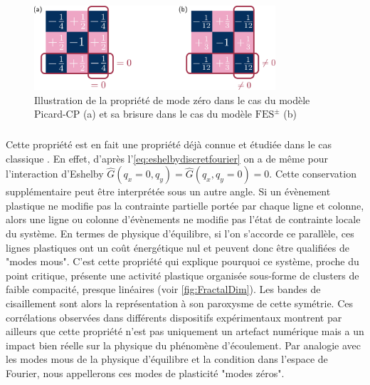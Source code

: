 \begin{figure}[h]
	\centering
	\includegraphics[width = 0.8\textwidth]{Chapitre4/Figures/CourtePortee/ZMCP.pdf}
	\caption{Illustration de la propriété de mode zéro dans le cas du modèle Picard-CP (a) et sa brisure dans le cas du modèle $\text{FES}^\pm$ (b)}
	\label{fig:Omodesshortrange}
\end{figure}

\subparagraph{}Cette propriété est en fait une propriété déjà connue et étudiée dans le cas classique \cite{tyukodi_dépiégeage_2016, ferrero_elastic_2019}. En effet, d'après l'\autoref{eq:eshelbydiscretfourier} on a de même pour l'interaction d'Eshelby $\hat{G}(q_x=0,q_y)=\hat{G}(q_x,q_y=0)=0$. Cette conservation supplémentaire peut être interprétée sous un autre angle. Si un évènement plastique ne modifie pas la contrainte partielle portée par chaque ligne et colonne, alors une ligne ou colonne d'évènements ne modifie pas l'état de contrainte locale du système. En termes de physique d'équilibre, si l'on s'accorde ce parallèle, ces lignes plastiques ont un coût énergétique nul et peuvent donc être qualifiées de "modes mous". C'est cette propriété qui explique pourquoi ce système, proche du point critique, présente une activité plastique organisée sous-forme de clusters de faible compacité, presque linéaires (voir \autoref{fig:FractalDim}). Les bandes de cisaillement \cite{martens_spontaneous_2012, rossi_finite-disorder_2022} sont alors la représentation à son paroxysme de cette symétrie. Ces corrélations observées dans différents dispositifs expérimentaux montrent par ailleurs que cette propriété n'est pas uniquement un artefact numérique mais a un impact bien réelle sur la physique du phénomène d'écoulement. Par analogie avec les modes mous de la physique d'équilibre et la condition dans l'espace de Fourier, nous appellerons ces modes de plasticité "modes zéros". 

